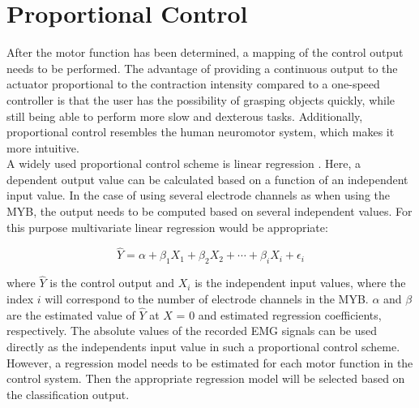 \section{Proportional Control}
After the motor function has been determined, a mapping of the control output needs to be performed. The advantage of providing a continuous output to the actuator proportional to the contraction intensity compared to a one-speed controller is that the user has the possibility of grasping objects quickly, while still being able to perform more slow and dexterous tasks. Additionally, proportional control resembles the human neuromotor system, which makes it more intuitive. \cite{Fougner2012} \\
A widely used proportional control scheme is linear regression \cite{Fougner2012}. Here, a dependent output value can be calculated based on a function of an independent input value. In the case of using several electrode channels as when using the MYB, the output needs to be computed based on several independent values. For this purpose multivariate linear regression would be appropriate:

\begin{equation}
	\hat{Y} = \alpha+\beta_{1}X_{1}+\beta_{2}X_{2}+\cdots+\beta_{i}X_{i}+\epsilon_{i}
\end{equation}

where $\hat{Y}$ is the control output and $X_{i}$ is the independent input values, where the index $i$ will correspond to the number of electrode channels in the MYB. $\alpha$ and $\beta$ are the estimated value of $\hat{Y}$ at $X$ = 0 and estimated regression coefficients, respectively. The absolute values of the recorded EMG signals can be used directly as the independents input value in such a proportional control scheme. \cite{Zar2009} However, a regression model needs to be estimated for each motor function in the control system. Then the appropriate regression model will be selected based on the classification output.  